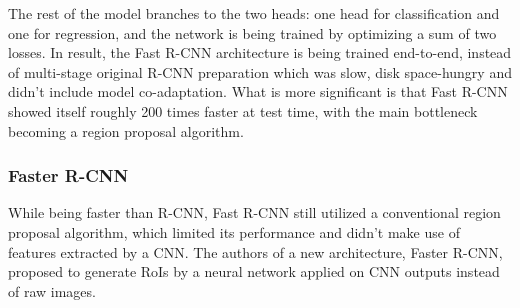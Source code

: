 \documentclass[thesis=B,english]{FITthesis}[2019/12/23]
\begin{document}
The rest of the model branches to the two heads: one head for classification and one for regression, and the network is being trained by optimizing a sum of two losses. In result, the Fast R-CNN architecture is being trained end-to-end, instead of multi-stage original R-CNN preparation which was slow, disk space-hungry and didn't include model co-adaptation. What is more significant is that Fast R-CNN showed itself roughly 200 times faster at test time, with the main bottleneck becoming a region proposal algorithm.

\subsubsection{Faster R-CNN}

While being faster than R-CNN, Fast R-CNN still utilized a conventional region proposal algorithm, which limited its performance and didn't make use of features extracted by a CNN. The authors of a new architecture, Faster R-CNN\cite{faster_rcnn}, proposed to generate RoIs by a neural network applied on CNN outputs instead of raw images.
\end{document}
